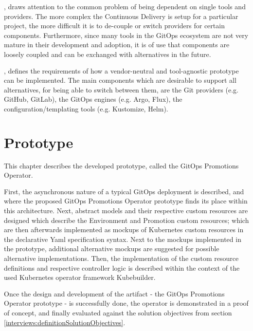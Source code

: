 \textbf{},
draws attention to the common problem of being dependent on single tools and providers.
The more complex the Continuous Delivery is setup for a particular project,
the more difficult it is to de-couple or switch providers for certain components.
Furthermore, since many tools in the GitOps ecosystem are not very mature in their development and adoption,
it is of use that components are loosely coupled and can be exchanged with alternatives in the future.

\textbf{},
defines the requirements of how a vendor-neutral and tool-agnostic prototype can be implemented.
The main components which are desirable to support all alternatives,
for being able to switch between them,
are the Git providers (e.g. GitHub, GitLab),
the GitOps engines (e.g. Argo, Flux),
the configuration/templating tools (e.g. Kustomize, Helm).


















\chapter{Prototype}
\label{chapter:prototype}

This chapter describes the developed prototype,
called the GitOps Promotions Operator.

First, the asynchronous nature of a typical GitOps deployment is described,
and where the proposed GitOps Promotions Operator prototype finds its place within
this architecture.
Next, abstract models and their respective custom resources are designed which describe the Environment and Promotion 
custom resources; which are then afterwards implemented as mockups of 
Kubernetes custom resources in the declarative Yaml specification syntax.
Next to the mockups implemented in the prototype,
additional alternative mockups are suggested for possible alternative implementations.
Then, the implementation of the custom resource definitions and respective controller logic
is described within the context of the used Kubernetes operator framework Kubebuilder.

Once the design and development of the artifact - the GitOps Promotions Operator prototype -
is successfully done,
the operator is demonstrated in a proof of concept,
and finally evaluated against the solution objectives
from section \ref{interviews:definitionSolutionObjectives}.

